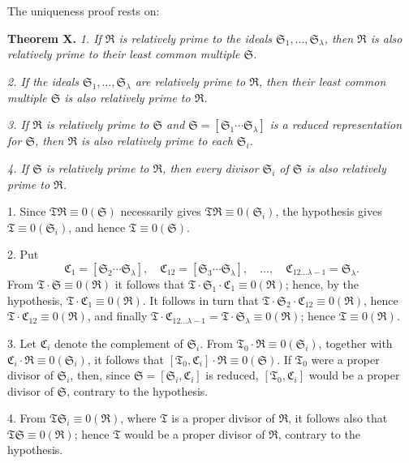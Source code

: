\documentclass[11pt]{article}
\providecommand{\ideal}[1]{\mathfrak{#1}}
\begin{document}
The uniqueness proof rests on:

\textbf{Theorem X.} \emph{1. If $\ideal R$ is relatively prime to the ideals $\ideal S_1,
\ldots,\ideal S_\lambda$, then $\ideal R$ is also relatively prime to their least common multiple $\ideal S$.}

\emph{2. If the ideals $\ideal S_1,
\ldots,\ideal S_\lambda$ are relatively prime to $\ideal R$, then their least common multiple $\ideal S$ is also relatively prime to $\ideal R$.}

\emph{3. If $\ideal R$ is relatively prime to $\ideal S$ and $\ideal S=[\ideal S_1\cdots\ideal S_\lambda]$ is a reduced representation for $\ideal S$, then $\ideal R$ is also relatively prime to each $\ideal S_i$.}

\emph{4. If $\ideal S$ is relatively prime to $\ideal R$, then every divisor $\ideal S_i$ of $\ideal S$ is also relatively prime to $\ideal R$.}

1. Since $\ideal T\ideal R\equiv0(\ideal S)$ necessarily gives $\ideal T\ideal R\equiv0(\ideal S_i)$, the hypothesis gives $\ideal T\equiv0(\ideal S_i)$, and hence $\ideal T\equiv0(\ideal S)$.

2. Put
\[
 \ideal C_1=[\ideal S_2\cdots\ideal S_\lambda],\quad
 \ideal C_{12}=[\ideal S_3\cdots\ideal S_\lambda],\quad \ldots,\quad
 \ideal C_{12\ldots\lambda-1}=\ideal S_\lambda.
\]
From $\ideal T\cdot\ideal S\equiv0(\ideal R)$ it follows that $\ideal T\cdot\ideal S_1\cdot\ideal C_1\equiv0(\ideal R)$; hence, by the hypothesis, $\ideal T\cdot\ideal C_1\equiv0(\ideal R)$. It follows in turn that $\ideal T\cdot\ideal S_2\cdot\ideal C_{12}\equiv0(\ideal R)$, hence $\ideal T\cdot\ideal C_{12}\equiv0(\ideal R)$, and finally $\ideal T\cdot\ideal C_{12\ldots\lambda-1}=\ideal T\cdot\ideal S_\lambda\equiv0(\ideal R)$; hence $\ideal T\equiv0(\ideal R)$.

3. Let $\ideal C_i$ denote the complement of $\ideal S_i$. From $\ideal T_0\cdot\ideal R\equiv0(\ideal S_i)$, together with $\ideal C_i\cdot\ideal R\equiv0(\ideal S_i)$, it follows that $[\ideal T_0,\ideal C_i]\cdot\ideal R\equiv0(\ideal S)$. If $\ideal T_0$ were a proper divisor of $\ideal S_i$, then, since $\ideal S=[\ideal S_i,\ideal C_i]$ is reduced, $[\ideal T_0,\ideal C_i]$ would be a proper divisor of $\ideal S$, contrary to the hypothesis.

4. From $\ideal T\ideal S_i\equiv0(\ideal R)$, where $\ideal T$ is a proper divisor of $\ideal R$, it follows also that $\ideal T\ideal S\equiv0(\ideal R)$; hence $\ideal T$ would be a proper divisor of $\ideal R$, contrary to the hypothesis.
\end{document}
